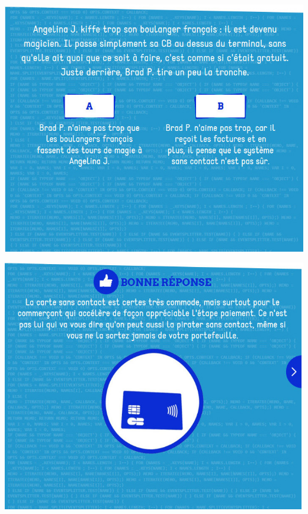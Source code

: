 \documentclass{beamer}
\begin{document}
\begin{frame}\includegraphics[scale=0.6] {./images/Quizz_HygieneNumerique_France4_22.jpg} \end{frame}
\begin{frame}\includegraphics[scale=0.6] {./images/Quizz_HygieneNumerique_France4_23.jpg} \end{frame}
\end{document}
